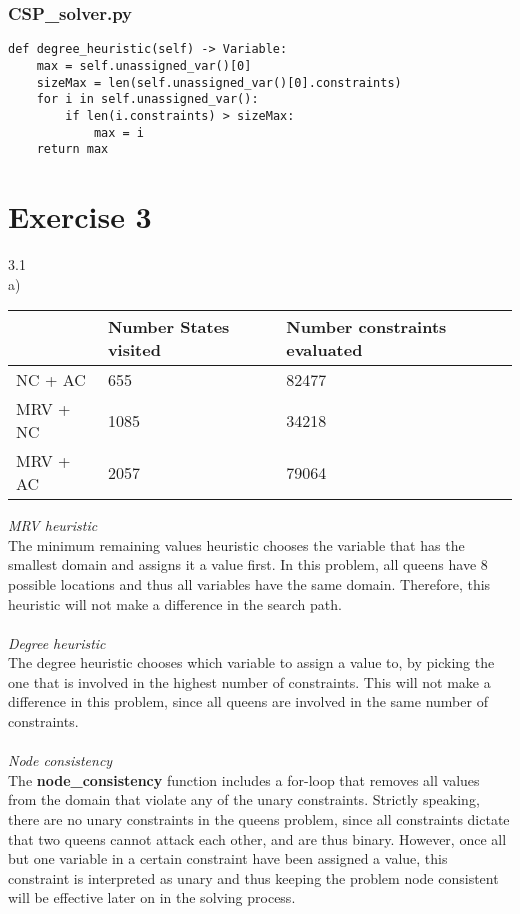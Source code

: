 \documentclass{article}
\begin{document}
\subsubsection*{CSP\_solver.py}
\begin{lstlisting} 
def degree_heuristic(self) -> Variable:
    max = self.unassigned_var()[0]
    sizeMax = len(self.unassigned_var()[0].constraints)
    for i in self.unassigned_var():
        if len(i.constraints) > sizeMax:
            max = i   
    return max
\end{lstlisting}
\section*{Exercise 3}
3.1
\\
a)
\begin{center}
\begin{tabular}{|l|l|l|}
\hline
         & Number States visited & Number constraints evaluated \\ \hline
NC + AC  & 655                   & 82477                        \\ \hline
MRV + NC & 1085                  & 34218                        \\ \hline
MRV + AC & 2057                  & 79064                        \\ \hline

\end{tabular}
\end{center}
\textit{MRV heuristic}\\
The minimum remaining values heuristic chooses the variable that has the smallest domain and assigns it a value first. In this problem, all queens have 8 possible locations and thus all variables have the same domain. Therefore, this heuristic will not make a difference in the search path. \\
\\
\textit{Degree heuristic}\\
The degree heuristic chooses which variable to assign a value to, by picking the one that is involved in the highest number of constraints. This will not make a difference in this problem, since all queens are involved in the same number of constraints. \\
\\
\textit{Node consistency}\\
The \textbf{node\_consistency} function includes a for-loop that removes all values from the domain that violate any of the unary constraints. Strictly speaking, there are no unary constraints in the queens problem, since all constraints dictate that two queens cannot attack each other, and are thus binary. However, once all but one variable in a certain constraint have been assigned a value, this constraint is interpreted as unary and thus keeping the problem node consistent will be effective later on in the solving process.\\
\end{document}
